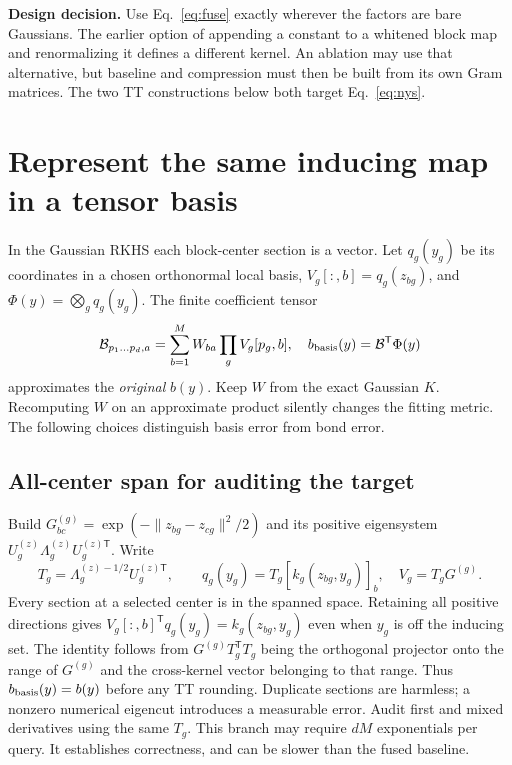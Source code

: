 \documentclass[11pt,a4paper]{article}
\newcommand{\T}{\mathsf T}\newcommand{\tr}{\operatorname{tr}}
\begin{document}
\textbf{Design decision.} Use Eq.~\eqref{eq:fuse} exactly wherever the factors are bare Gaussians. The earlier option of appending a constant to a whitened block map and renormalizing it defines a different kernel. An ablation may use that alternative, but baseline and compression must then be built from its own Gram matrices. The two TT constructions below both target Eq.~\eqref{eq:nys}.

\pg\section{Represent the same inducing map in a tensor basis}\label{sec:leaves}
In the Gaussian RKHS each block-center section is a vector. Let $q_g(y_g)$ be its coordinates in a chosen orthonormal local basis, $V_g[:,b]=q_g(z_{bg})$, and $\Phi(y)=\bigotimes_g q_g(y_g)$. The finite coefficient tensor
\begin{equation}
 \mathcal B_{p_1\ldots p_d,a}=\sum_{b=1}^M W_{ba}\prod_g V_g[p_g,b],
 \quad b_{\rm basis}(y)=\mathcal B^\T\Phi(y) \label{eq:basist}
\end{equation}
approximates the \emph{original} $b(y)$. Keep $W$ from the exact Gaussian $K$. Recomputing $W$ on an approximate product silently changes the fitting metric. The following choices distinguish basis error from bond error.

\subsection{All-center span for auditing the target}
Build $G^{(g)}_{bc}=\exp(-\|z_{bg}-z_{cg}\|^2/2)$ and its positive eigensystem $U_g^{(z)}\Lambda_g^{(z)}U_g^{(z)\T}$. Write
\begin{equation}
 T_g=\Lambda_g^{(z)-1/2}U_g^{(z)\T},\qquad
 q_g(y_g)=T_g[k_g(z_{bg},y_g)]_b,\quad V_g=T_gG^{(g)}. \label{eq:featuremap}
\end{equation}
Every section at a selected center is in the spanned space. Retaining all positive directions gives $V_g[:,b]^\T q_g(y_g)=k_g(z_{bg},y_g)$ even when $y_g$ is off the inducing set. The identity follows from $G^{(g)}T_g^\T T_g$ being the orthogonal projector onto the range of $G^{(g)}$ and the cross-kernel vector belonging to that range. Thus $b_{\rm basis}(y)=b(y)$ before any TT rounding. Duplicate sections are harmless; a nonzero numerical eigencut introduces a measurable error. Audit first and mixed derivatives using the same $T_g$. This branch may require $dM$ exponentials per query. It establishes correctness, and can be slower than the fused baseline.
\end{document}
